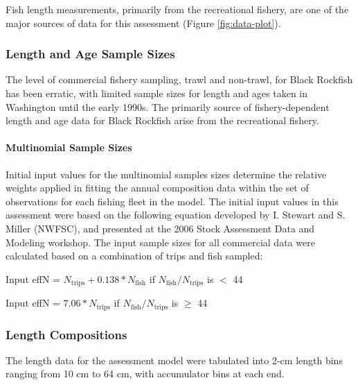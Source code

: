 \documentclass[11pt,
  english,
  letterpaper,
]{article}
\begin{document}
Fish length measurements, primarily from the recreational fishery, are one of the major sources of data for this assessment (Figure \ref{fig:data-plot}).

\hypertarget{length-and-age-sample-sizes}{%
\subsubsection{Length and Age Sample Sizes}\label{length-and-age-sample-sizes}}

The level of commercial fishery sampling, trawl and non-trawl, for Black Rockfish has been erratic, with limited sample sizes for length and ages taken in Washington until the early 1990s. The primarily source of fishery-dependent length and age data for Black Rockfish arise from the recreational fishery.

\hypertarget{multinomial-sample-sizes}{%
\paragraph{Multinomial Sample Sizes}\label{multinomial-sample-sizes}}

Initial input values for the multinomial samples sizes determine the relative weights applied in fitting the annual composition data within the set of observations for each fishing fleet in the model. The initial input values in this assessment were based on the following equation developed by I. Stewart and S. Miller (NWFSC), and presented at the 2006 Stock Assessment Data and Modeling workshop. The input sample sizes for all commercial data were calculated based on a combination of trips and fish sampled:

\begin{centering}

Input effN = $N_{\text{trips}} + 0.138 * N_{\text{fish}}$ if $N_{\text{fish}}/N_{\text{trips}}$ is $<$ 44

Input effN = $7.06 * N_{\text{trips}}$ if $N_{\text{fish}}/N_{\text{trips}}$ is $\geq$ 44

\end{centering}

\hypertarget{length-compositions}{%
\subsubsection{Length Compositions}\label{length-compositions}}

The length data for the assessment model were tabulated into 2-cm length bins ranging from 10 cm to 64 cm, with accumulator bins at each end.
\end{document}
